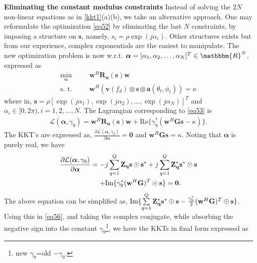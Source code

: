 \documentclass[11pt,draftclsnofoot,onecolumn]{IEEEtran}
\theoremstyle{definition}
\theoremstyle{remark}
\begin{document}
{\bf Eliminating the constant modulus constraints} Instead of solving the $2N$ non-linear equations as in \eqref{kkt1}(a)(b), we take an alternative approach. One may reformulate the optimization \eqref{eq52} by eliminating the last $N$ constraints, by imposing  a structure on $\mathbf{s}$, namely, $s_i=\rho\exp(j\alpha_i)$. Other structures exists but from our experience, complex exponentials are the easiest to manipulate. The new optimization problem is now w.r.t. $\boldsymbol{\alpha}=[\alpha_1,\alpha_2,\ldots,\alpha_{N}]^T\in\mathbbm{R}^N$, expressed as
\begin{align}
\min\limits_{\boldsymbol{\alpha}} \;\;\;\;\; &\mathbf{w}^H\mathbf{R_u}(\mathbf{s})\mathbf{w} \nonumber \\
\mbox{s. t. }\;\;\;\;\; & \mathbf{w}^H(\mathbf{v}(f_d)\otimes\mathbf{s}\otimes\mathbf{a}(\theta_t,\phi_t))=\kappa  \label{eq53}
\end{align}
where in,
$\mathbf{s}=\rho[\exp(j\alpha_1),\exp(j\alpha_2),\ldots,\exp(j\alpha_{N})]^T$ and $\alpha_i \in [0,2\pi),i=1,2,\ldots, N$.
The Lagrangian corresponding to \eqref{eq53} is
\begin{align} \label{eq54}
\mathcal{L}(\boldsymbol{\alpha},\gamma_9)=\mathbf{w}^H\mathbf{R_u}(\mathbf{s})\mathbf{w} +\mbox{Re}\{ \gamma_9^{\ast}(\mathbf{w}^H\mathbf{Gs}-\kappa)\}.
\end{align}
The KKT's are expressed as, $\tfrac{\partial\mathcal{L}(\boldsymbol{\alpha},\gamma_9)}{\partial \boldsymbol{\alpha}}=\mathbf{0}$ and $\mathbf{w}^H\mathbf{Gs}=\kappa$. Noting that $\boldsymbol{\alpha}$ is purely real, we have
\begin{equation}\label{eq56}
\begin{aligned}
\frac{\partial\mathcal{L}(\boldsymbol{\alpha},\gamma_9)}{\partial \boldsymbol{\alpha}}=-&j\sum\limits_{q=1}^Q\mathbf{Z_q}\mathbf{s}\odot \mathbf{s}^{\ast}+j\sum\limits_{q=1}^Q\mathbf{Z}_{\bf q}^{\ast}\mathbf{s}^{\ast}\odot \mathbf{s} \\
+&\mbox{Im}\{ \gamma_9^{\ast}(\mathbf{w}^H\mathbf{G} )^T\odot \mathbf{s}\} =\mathbf{0}.
\end{aligned}
\end{equation}
The above equation can be simplified as, $\mbox{Im}\{ \sum\limits_{q=1}^Q\mathbf{Z}_{\bf q}^{\ast}\mathbf{s}^{\ast}\odot \mathbf{s} -\frac{\gamma_9^{\ast}}{2}(\mathbf{w}^H\mathbf{G})^T\odot \mathbf{s}\}$. Using this in \eqref{eq56}, and taking the complex conjugate, while absorbing the negative sign into the constant $\gamma_9$\footnote{new $\gamma_9$=old $-\gamma_9$.}, we have the KKTs in final form expressed as
\end{document}
